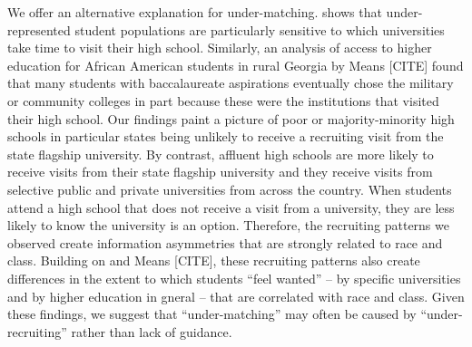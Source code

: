 \documentclass[twoside]{article}
\begin{document}
We offer an alternative explanation for under-matching. \cite{RN4324} shows that under-represented student populations are particularly sensitive to which universities take time to visit their high school. Similarly, an analysis of access to higher education for African American students in rural Georgia by Means [CITE] found that many students with baccalaureate aspirations eventually chose the military or community colleges in part because these were the institutions that visited their high school. Our findings paint a picture of poor or majority-minority high schools in particular states being unlikely to receive a recruiting visit from the state flagship university.  By contrast, affluent high schools are more likely to receive visits from their state flagship university and they receive visits from selective public and private universities from across the country.  When students attend a high school that does not receive a visit from a university, they are less likely to know the university is an option.  Therefore, the recruiting patterns we observed create information asymmetries that are strongly related to race and class.  Building on \cite{RN4324} and Means [CITE], these recruiting patterns also create differences in the extent to which students ``feel wanted'' -- by specific universities and by higher education in gneral -- that are correlated with race and class.  Given these findings, we suggest that ``under-matching'' may often be caused by ``under-recruiting'' rather than lack of guidance.



\end{document}
